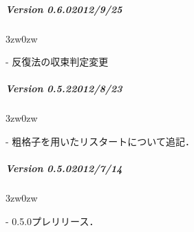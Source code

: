 { \small


%
\subparagraph{Version 0.6.0\hspace{1cm}2012/9/25}

\begin{description}
\begin{indentation}{3zw}{0zw}
\item[-] 反復法の収束判定変更
\end{indentation}
\end{description}
\vspace{3mm}

%
\subparagraph{Version 0.5.2\hspace{1cm}2012/8/23}

\begin{description}
\begin{indentation}{3zw}{0zw}
\item[-] 粗格子を用いたリスタートについて追記．
\end{indentation}
\end{description}
\vspace{3mm}

%
\subparagraph{Version 0.5.0\hspace{1cm}2012/7/14}

\begin{description}
\begin{indentation}{3zw}{0zw}
\item[-] 0.5.0プレリリース．
\end{indentation}
\end{description}

} %
